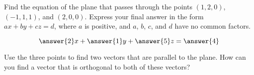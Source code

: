 \documentclass{ximera}
\author{Jim Talamo}
\begin{document}
\begin{exercise}
Find the equation of the plane that passes through the points $(1,2,0)$, $(-1,1,1)$, and $(2,0,0)$.  Express your final answer in the form $ax+by+cz=d$, where $a$ is positive, and $a$, $b$, $c$, and $d$ have no common factors.

\[
\answer{2}x+\answer{1}y+\answer{5}z=\answer{4}
\]

\begin{hint}
Use the three points to find two vectors that are parallel to the plane.  How can you find a vector that is orthogonal to both of these vectors?
\end{hint}
\end{exercise}
\end{document}

